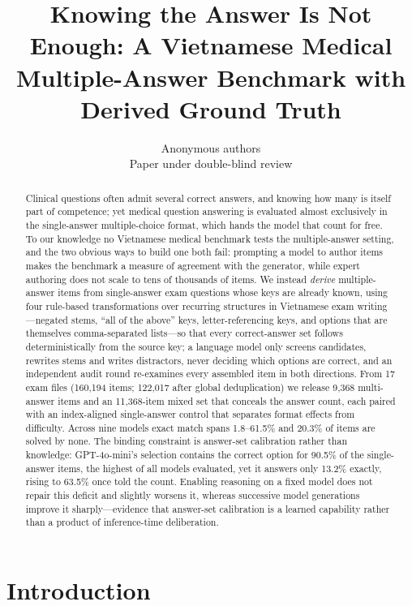 \documentclass{article} %
\title{Knowing the Answer Is Not Enough: A Vietnamese Medical\\
Multiple-Answer Benchmark with Derived Ground Truth}
\author{Anonymous authors\\
Paper under double-blind review}
\begin{document}
\maketitle

\begin{abstract}
Clinical questions often admit several correct answers, and knowing how many is
itself part of competence; yet medical question answering is evaluated almost
exclusively in the single-answer multiple-choice format, which hands the model that
count for free. To our knowledge no Vietnamese medical benchmark tests the
multiple-answer setting, and the two obvious ways to build one both fail: prompting a
model to author items makes the benchmark a measure of agreement with the generator,
while expert authoring does not scale to tens of thousands of items. We instead
\emph{derive} multiple-answer items from single-answer exam questions whose keys are
already known, using four rule-based transformations over recurring structures in
Vietnamese exam writing---negated stems, ``all of the above'' keys, letter-referencing
keys, and options that are themselves comma-separated lists---so that every
correct-answer set follows deterministically from the source key; a language model only
screens candidates, rewrites stems and writes distractors, never deciding which options
are correct, and an independent audit round re-examines every assembled item in both
directions. From 17 exam files (160,194 items; 122,017 after global deduplication) we
release 9,368 multi-answer items and an 11,368-item mixed set that conceals the answer
count, each paired with an index-aligned single-answer control that separates format
effects from difficulty. Across nine models exact match spans 1.8--61.5\% and 20.3\% of
items are solved by none. The binding constraint is answer-set calibration rather than
knowledge: GPT-4o-mini's selection contains the correct option for 90.5\% of the
single-answer items, the highest of all models evaluated, yet it answers only 13.2\%
exactly, rising to 63.5\% once told the count. Enabling reasoning on a fixed model does
not repair this deficit and slightly worsens it, whereas successive model generations
improve it sharply---evidence that answer-set calibration is a learned capability rather
than a product of inference-time deliberation.
\end{abstract}

\section{Introduction}
\end{document}
